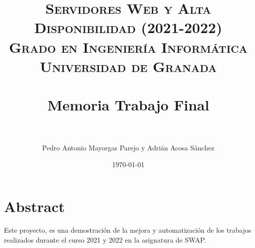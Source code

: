 


\title{
\normalfont \normalsize
\textsc{\textbf{Servidores Web y Alta Disponibilidad (2021-2022)} \\ Grado en Ingeniería Informática \\ Universidad de Granada} \\ [25pt] %
\horrule{0.5pt} \\[0.4cm] %
\huge Memoria Trabajo Final \\ %
\horrule{2pt} \\[0.5cm] %
}

\graphicspath{ {img/} }

\author{Pedro Antonio Mayorgas Parejo y Adrián Acosa Sánchez} %

\date{\normalsize\today} %




\maketitle %

\newpage %

\tableofcontents %

\newpage


\section{Abstract}

Este proyecto, es una demostración de la mejora y automatización de los trabajos realizados durante el curso 2021 y 2022 en la asignatura de SWAP.
\vspace{5mm}


